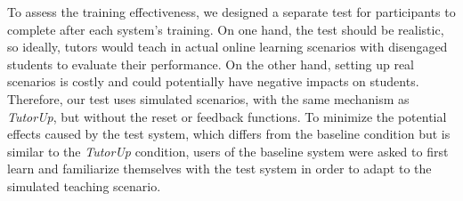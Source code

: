 To assess the training effectiveness, we designed a separate test for participants to complete after each system’s training. 
On one hand, the test should be realistic, so ideally, tutors would teach in actual online learning scenarios with disengaged students to evaluate their performance. On the other hand, setting up real scenarios is costly and could potentially have negative impacts on students. Therefore, our test uses simulated scenarios, with the same mechanism as \textit{TutorUp}, but without the reset or feedback functions. To minimize the potential effects caused by the test system, which differs from the baseline condition but is similar to the \textit{TutorUp} condition, users of the baseline system were asked to first learn and familiarize themselves with the test system in order to adapt to the simulated teaching scenario.



